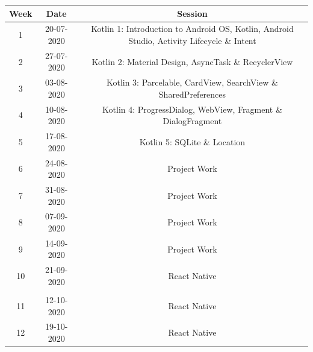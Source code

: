 \documentclass{article}
\begin{document}
\renewcommand{\arraystretch}{1.5}
\begin{tabular}{|c|c|c|}
	\hline
	\textbf{Week} & \textbf{Date} & \textbf{Session}                                                                       \\ \hline                  
	\small 1             & \small 20-07-2020    & \small Kotlin 1: Introduction to Android OS, Kotlin, Android Studio, Activity Lifecycle \& Intent  \\ \hline         
	\small 2             & \small 27-07-2020    & \small Kotlin 2: Material Design, AsyncTask \& RecyclerView                                      \\ \hline            
	\small 3             & \small 03-08-2020    & \small Kotlin 3: Parcelable, CardView, SearchView \& SharedPreferences                           \\ \hline           
	\small 4             & \small 10-08-2020    & \small Kotlin 4: ProgressDialog, WebView, Fragment \& DialogFragment                               \\ \hline        
	\small 5             & \small 17-08-2020    & \small Kotlin 5: SQLite \& Location                                                                \\ \hline     
	\small 6             & \small 24-08-2020    & \small Project Work                                                                                \\ \hline        
	\small 7             & \small 31-08-2020    & \small Project Work                                                                               \\ \hline                            
	\small 8             & \small 07-09-2020    & \small Project Work                                                                           \\ \hline             
	\small 9             & \small 14-09-2020    & \small Project Work                                  \\ \hline
	\small 10            & \small 21-09-2020    & \small React Native                                                \\ \hline                  
	\rowcolor{yellow} \multicolumn{3}{|c|}{\small Mid Term Break}  															   \\ \hline  
	\small 11            & \small 12-10-2020    & \small React Native                                         \\ \hline         
	\small 12            & \small 19-10-2020    & \small React Native                                                        \\ \hline                                 

\end{tabular}
\end{document}
